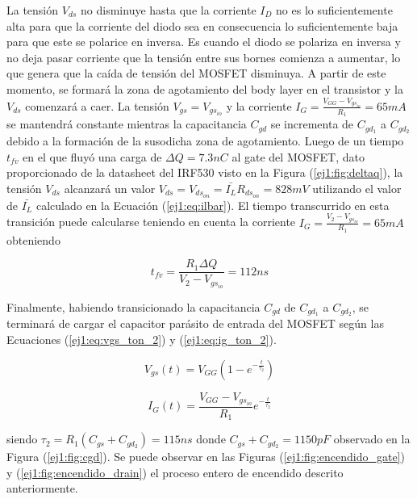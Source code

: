La tensión $V_{ds}$ no disminuye hasta que la corriente $I_D$ no es lo suficientemente alta para que la corriente del diodo sea en consecuencia lo suficientemente baja para que este se polarice en inversa. Es cuando el diodo se polariza en inversa y no deja pasar corriente que la tensión entre sus bornes comienza a aumentar, lo que genera que la caída de tensión del MOSFET disminuya. A partir de este momento, se formará la zona de agotamiento del body layer en el transistor y la $V_{ds}$ comenzará a caer. La tensión $V_{gs} = V_{gs_{io}}$ y la corriente $I_G = \frac{V_{GG}-V_{gs_{io}}}{R_1} = 65mA$ se mantendrá constante mientras la capacitancia $C_{gd}$ se incrementa de $C_{gd_1}$ a $C_{gd_2}$ debido a la formación de la susodicha zona de agotamiento. Luego de un tiempo $t_{fv}$ en el que fluyó una carga de $\Delta Q = 7.3nC$ al gate del MOSFET, dato proporcionado de la datasheet del IRF530 visto en la Figura (\ref{ej1:fig:deltaq}), la tensión $V_{ds}$ alcanzará un valor $V_{ds} = V_{ds_{on}} = \bar{I_L} R_{ds_{on}} = 828mV$ utilizando el valor de $\bar{I_L}$ calculado en la Ecuación (\ref{ej1:eq:ilbar}). El tiempo transcurrido en esta transición puede calcularse teniendo en cuenta la corriente $I_G = \frac{V_2 - V_{gs_{io}}}{R_1}= 65mA$ obteniendo

\begin{equation}
	t_{fv} = \frac{R_1 \Delta Q}{V_2 - V_{gs_{io}}} = 112ns
	\label{ej1:eq:tfv}
\end{equation}

Finalmente, habiendo transicionado la capacitancia $C_{gd}$ de $C_{gd_1}$ a $C_{gd_2}$, se terminará de cargar el capacitor parásito de entrada del MOSFET según las Ecuaciones (\ref{ej1:eq:vgs_ton_2}) y (\ref{ej1:eq:ig_ton_2}).

\begin{equation}
V_{gs}(t) = V_{GG}(1-e^{-\frac{t}{\tau_2}})
\label{ej1:eq:vgs_ton_2}
\end{equation}

\begin{equation}
I_{G}(t) =  \frac{V_{GG}-V_{gs_{io}}}{R_1}e^{-\frac{t}{\tau_2}}
\label{ej1:eq:ig_ton_2}
\end{equation}

siendo $\tau_2 = R_1(C_{gs} + C_{gd_2}) = 115ns$ donde $C_{gs} + C_{gd_2} = 1150pF$ observado en la Figura (\ref{ej1:fig:cgd}). Se puede observar en las Figuras (\ref{ej1:fig:encendido_gate}) y (\ref{ej1:fig:encendido_drain}) el proceso entero de encendido descrito anteriormente.


